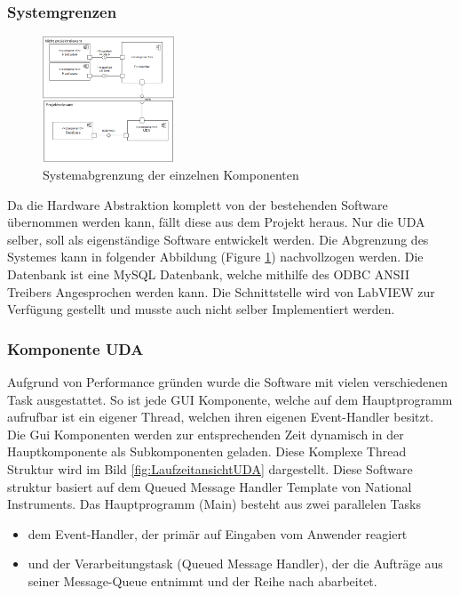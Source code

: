 \documentclass[10pt]{scrartcl}
\begin{document}
\subsubsection{Systemgrenzen}
\begin{figure}
	\begin{center}
		\includegraphics[width=0.35\textwidth]{Systemgrenzen}
		\caption{Systemabgrenzung der einzelnen Komponenten}
		\label{fig:SystemView}			
	\end{center}
\end{figure}
Da die Hardware Abstraktion komplett von der bestehenden Software übernommen werden kann, fällt diese aus dem Projekt heraus. Nur die UDA selber, soll als eigenständige Software entwickelt werden. Die Abgrenzung des Systemes kann in folgender Abbildung (Figure \ref{fig:SystemView}) nachvollzogen werden.
 Die Datenbank ist eine MySQL Datenbank, welche mithilfe des ODBC ANSII Treibers Angesprochen werden kann. Die Schnittstelle wird von \gls{LabVIEW} zur Verfügung gestellt und musste auch nicht selber Implementiert werden.
\subsubsection{Komponente UDA}
Aufgrund von Performance gründen wurde die Software mit vielen verschiedenen Task ausgestattet. So ist jede GUI Komponente, welche auf dem Hauptprogramm aufrufbar ist ein eigener Thread,  welchen ihren eigenen Event-Handler besitzt. Die Gui Komponenten werden zur entsprechenden Zeit dynamisch in der Hauptkomponente als Subkomponenten geladen. Diese Komplexe Thread Struktur wird im Bild \ref{fig:LaufzeitansichtUDA} dargestellt. Diese Software struktur basiert auf dem Queued Message Handler Template von National Instruments.
Das Hauptprogramm (Main) besteht aus zwei parallelen Tasks
\begin{itemize}
	\item dem Event-Handler, der primär auf Eingaben vom Anwender reagiert
	\item und der Verarbeitungstask (Queued Message Handler), der die Aufträge aus seiner Message-Queue entnimmt und der Reihe nach abarbeitet.
\end{itemize}
\end{document}
